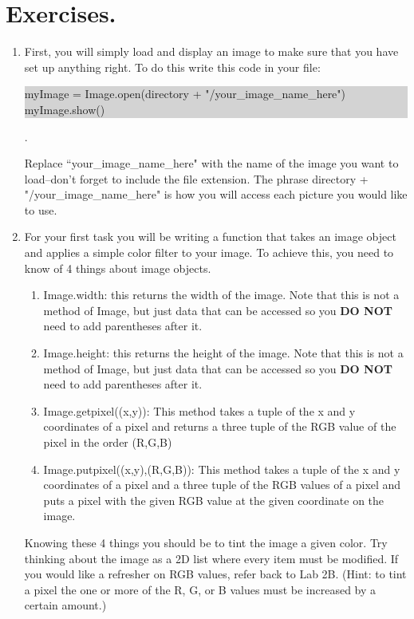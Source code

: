 \documentclass[11pt, letterpaper, onecolumn, oneside, final]{article}
\begin{document}
\section{Exercises.}
\begin{enumerate}
    \item First, you will simply load and display an image to make sure that you have set up anything right. To do this write this code in your file:
     \begin{center}
        \colorbox{lightgray}{\parbox{.73\textwidth}{\consolas myImage = Image.open(directory + "/your\_image\_name\_here")\\
        myImage.show()}}.
    \end{center}
    Replace \textquotedblleft your\_image\_name\_here" with the name of the image you want to load--don't forget to include the file extension. The phrase {\consolas directory + "/your\_image\_name\_here"} is how you will access each picture you would like to use.
    
    \item For your first task you will be writing a function that takes an image object and applies a simple color filter to your image. To achieve this, you need to know of 4 things about image objects.
    \begin{enumerate}
        \item {\consolas Image.width}: this returns the width of the image. Note that this is not a method of Image, but just data that can be accessed so you \textbf{DO NOT} need to add parentheses after it.
        \item {\consolas Image.height}: this returns the height of the image. Note that this is not a method of Image, but just data that can be accessed so you \textbf{DO NOT} need to add parentheses after it.
        \item {\consolas Image.getpixel((x,y))}: This method takes a tuple of the x and y coordinates of a pixel and returns a three tuple of the RGB value of the pixel in the order (R,G,B)
        \item {\consolas Image.putpixel((x,y),(R,G,B))}: This method takes a tuple of the x and y coordinates of a pixel and a three tuple of the RGB values of a pixel and puts a pixel with the given RGB value at the given coordinate on the image.
    \end{enumerate}
    Knowing these 4 things you should be to tint the image a given color. Try thinking about the image as a 2D list where every item must be modified. If you would like a refresher on RGB values, refer back to Lab 2B. (Hint: to tint a pixel the one or more of the R, G, or B values must be increased by a certain amount.)
    

\end{enumerate}
\end{document}
